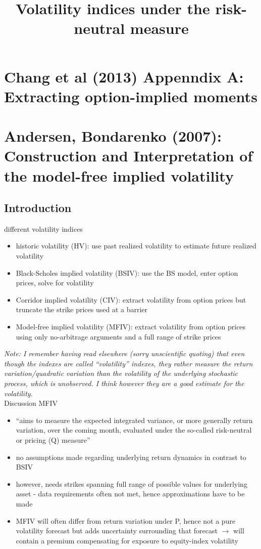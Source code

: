 \documentclass{article}
\title{Volatility indices under the risk-neutral measure}
\begin{document}
\maketitle

\section{Chang et al (2013) Appenndix A: Extracting option-implied moments}

\section{Andersen, Bondarenko (2007): Construction and Interpretation of the model-free implied volatility}

\subsection{Introduction}

different volatility indices
\begin{itemize}
    \item historic volatility (HV): use past realized volatility to estimate future realized volatility
    \item Black-Scholes implied volatility (BSIV): use the BS model, enter option prices, solve for volatility
    \item Corridor implied volatility (CIV): extract volatility from option prices but truncate the strike prices used at a barrier
    \item Model-free implied volatility (MFIV): extract volatility from option prices using only no-arbitrage arguments and a full range of strike prices 
\end{itemize}

\textit{Note: I remember having read elsewhere (sorry unscientific quoting) that even though the indexes are called ``volatility'' indexes, they rather measure the return variation/quadratic variation than the volatility of the underlying stochastic process, which is unobserved. I think however they are a good estimate for the volatility.}\\

Discussion MFIV
\begin{itemize}
\item ``aims to measure the expected integrated variance, or more generally return variation, over the coming month, evaluated under the so-called risk-neutral or pricing (Q) measure''
\item no assumptions made regarding underlying return dynamics in contrast to BSIV
\item however, needs strikes spanning full range of possible values for underlying asset - data requirements often not met, hence approximations have to be made
\item MFIV will often differ from return variation under P, hence not a pure volatility forecast but adds uncertainty surrounding that forecast $\rightarrow$ will contain a premium compensating for exposure to equity-index volatility
\end{itemize}
\end{document}
